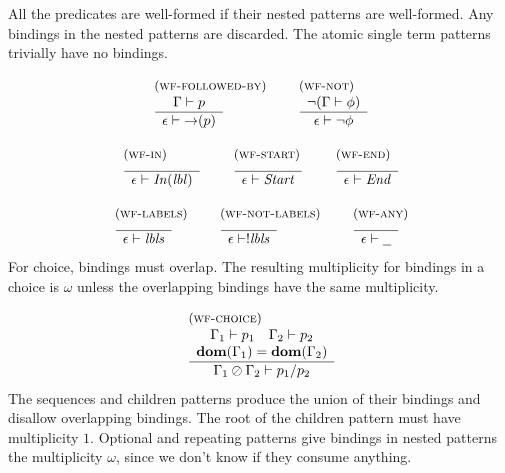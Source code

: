 \documentclass{article}
\newcommand{\rulename}{\textsc}
\newcommand{\irule}[3]{\begin{array}{l}{~\small\mbox{(\rulename{#1})}}\\\;\frac{\begin{array}{c}#2\end{array}}{\begin{array}{l}#3\end{array}}\end{array}}
\newcommand{\lbl}{\ensuremath{\mathit{lbl}}}
\newcommand{\lbls}{\ensuremath{\mathit{lbls}}}
\newcommand{\wfp}[2]{\ensuremath{#1 \vdash #2}}
\newcommand{\por}[2]{\ensuremath{#1/#2}}
\newcommand{\pnot}[1]{\ensuremath{\lnot #1}}
\newcommand{\any}{\ensuremath{\text{\underline{\hspace{0.6em}}}}}
\newcommand{\fb}[1]{\ensuremath{\mathop{\rightarrow}(#1)}}
\newcommand{\pin}[1]{\ensuremath{\mathit{In}(#1)}}
\newcommand{\pstart}{\ensuremath{\mathit{Start}}}
\newcommand{\pend}{\ensuremath{\mathit{End}}}
\begin{document}
\noindent
All the predicates are well-formed if their nested patterns are
well-formed. Any bindings in the nested patterns are discarded.
%
The atomic single term patterns trivially have no bindings.

\[
  \begin{array}{c}
    \irule{wf-followed-by}{
    \wfp{\Gamma}{p}
    }{
    \wfp{\epsilon}{\fb{p}}
    }
    \quad
    \irule{wf-not}{
    \lnot(\wfp{\Gamma}{\phi})
    }{
    \wfp{\epsilon}{\pnot{\phi}}
    }
    \\\\
    \irule{wf-in}{
    }{
    \wfp{\epsilon}{\pin{\lbl}}
    }
    \quad
    \irule{wf-start}{
    }{
    \wfp{\epsilon}{\pstart}
    }
    \quad
    \irule{wf-end}{
    }{
    \wfp{\epsilon}{\pend}
    }
    \\\\
    \irule{wf-labels}{
    }{
    \wfp{\epsilon}{\lbls}
    }
    \quad
    \irule{wf-not-labels}{
    }{
    \wfp{\epsilon}{!\lbls}
    }
    \quad
    \irule{wf-any}{
    }{
    \wfp{\epsilon}{\any}
    }
  \end{array}
\]
%
For choice, bindings must overlap. The resulting multiplicity for
bindings in a choice is $\omega$ unless the overlapping bindings
have the same multiplicity.

\[
  \begin{array}{c}
    \irule{wf-choice}{
    \wfp{\Gamma_1}{p_1}
    \quad
    \wfp{\Gamma_2}{p_2}\\
    \mathbf{dom}(\Gamma_1) = \mathbf{dom}(\Gamma_2)
    }{
    \wfp{\Gamma_1 \oslash \Gamma_2}{\por{p_1}{p_2}}
    }
  \end{array}
\]
%
The sequences and children patterns produce the union of their
bindings and disallow overlapping bindings. The root of the
children pattern must have multiplicity $1$.
%
Optional and repeating patterns give bindings in nested patterns
the multiplicity $\omega$, since we don't know if they consume
anything.
\end{document}
